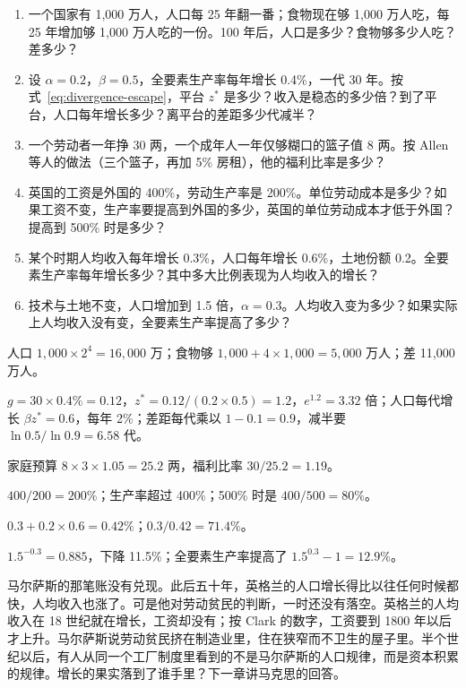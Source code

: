 \begin{selfcheck}
\begin{enumerate}
\item 一个国家有 1,000 万人，人口每 25 年翻一番；食物现在够 1,000 万人吃，每 25 年增加够 1,000 万人吃的一份。100 年后，人口是多少？食物够多少人吃？差多少？
\item 设 $\alpha=0.2$，$\beta=0.5$，全要素生产率每年增长 0.4\%，一代 30 年。按式~\eqref{eq:divergence-escape}，平台 $z^{*}$ 是多少？收入是稳态的多少倍？到了平台，人口每年增长多少？离平台的差距多少代减半？
\item 一个劳动者一年挣 30 两，一个成年人一年仅够糊口的篮子值 8 两。按 Allen 等人的做法（三个篮子，再加 5\% 房租），他的福利比率是多少？
\item 英国的工资是外国的 400\%，劳动生产率是 200\%。单位劳动成本是多少？如果工资不变，生产率要提高到外国的多少，英国的单位劳动成本才低于外国？提高到 500\% 时是多少？
\item 某个时期人均收入每年增长 0.3\%，人口每年增长 0.6\%，土地份额 0.2。全要素生产率每年增长多少？其中多大比例表现为人均收入的增长？
\item 技术与土地不变，人口增加到 1.5 倍，$\alpha=0.3$。人均收入变为多少？如果实际上人均收入没有变，全要素生产率提高了多少？
\end{enumerate}
\end{selfcheck}

\begin{answers}
\item 人口 $1{,}000\times2^{4}=16{,}000$ 万；食物够 $1{,}000+4\times1{,}000=5{,}000$ 万人；差 11,000 万人。
\item $g=30\times0.4\%=0.12$，$z^{*}=0.12/(0.2\times0.5)=1.2$，$e^{1.2}=3.32$ 倍；人口每代增长 $\beta z^{*}=0.6$，每年 2\%；差距每代乘以 $1-0.1=0.9$，减半要 $\ln0.5/\ln0.9=6.58$ 代。
\item 家庭预算 $8\times3\times1.05=25.2$ 两，福利比率 $30/25.2=1.19$。
\item $400/200=200\%$；生产率超过 400\%；500\% 时是 $400/500=80\%$。
\item $0.3+0.2\times0.6=0.42\%$；$0.3/0.42=71.4\%$。
\item $1.5^{-0.3}=0.885$，下降 11.5\%；全要素生产率提高了 $1.5^{0.3}-1=12.9\%$。
\end{answers}

马尔萨斯的那笔账没有兑现。此后五十年，英格兰的人口增长得比以往任何时候都快，人均收入也涨了。可是他对劳动贫民的判断，一时还没有落空。英格兰的人均收入在 18 世纪就在增长，工资却没有；按 Clark 的数字，工资要到 1800 年以后才上升。马尔萨斯说劳动贫民挤在制造业里，住在狭窄而不卫生的屋子里。半个世纪以后，有人从同一个工厂制度里看到的不是马尔萨斯的人口规律，而是资本积累的规律。增长的果实落到了谁手里？下一章讲马克思的回答。
